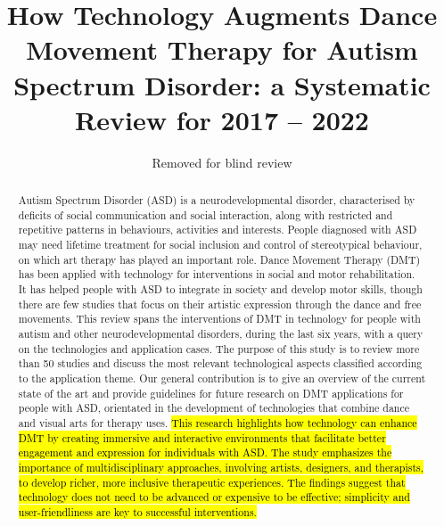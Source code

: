 \documentclass[a4paper,fleqn]{cas-sc}
\begin{document}
\let\WriteBookmarks\relax
\def\floatpagepagefraction{1}
\def\textpagefraction{.001}



\title[mode = title]{How Technology Augments Dance Movement Therapy for Autism Spectrum Disorder: a Systematic Review for 2017 -- 2022}


\author[]{Removed for blind review}            

\begin{abstract}
Autism Spectrum Disorder (ASD) is a neurodevelopmental disorder, characterised by deficits of social communication and social interaction, along with restricted and repetitive patterns in behaviours, activities and interests. People diagnosed with ASD may need lifetime treatment for social inclusion and control of stereotypical behaviour, on which art therapy has played an important role.
Dance Movement Therapy (DMT) has been applied with technology for interventions in social and motor rehabilitation. It has helped people with ASD to integrate in society and develop motor skills, though there are few studies that focus on their artistic expression through the dance and free movements.
This review spans the interventions of DMT in technology for people with autism and other neurodevelopmental disorders, during the last six years, with a query on the technologies and application cases. The purpose of this study is to review more than 50 studies and discuss the most relevant technological aspects classified according to the application theme.
Our general contribution is to give an overview of the current state of the art and provide guidelines for future research on DMT applications for people with ASD, orientated in the development of technologies that combine dance and visual arts for therapy uses.
\hl{This research highlights how technology can enhance DMT by creating immersive and interactive environments that facilitate better engagement and expression for individuals with ASD. The study emphasizes the importance of multidisciplinary approaches, involving artists, designers, and therapists, to develop richer, more inclusive therapeutic experiences. The findings suggest that technology does not need to be advanced or expensive to be effective; simplicity and user-friendliness are key to successful interventions.}
\end{abstract}
\end{document}
